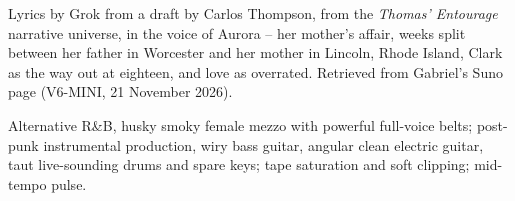 
\begin{notes}
Lyrics by Grok from a draft by Carlos Thompson, from the \emph{Thomas' Entourage} narrative universe, in the voice of Aurora -- her mother's affair, weeks split between her father in Worcester and her mother in Lincoln, Rhode Island, Clark as the way out at eighteen, and love as overrated. Retrieved from Gabriel's Suno page (V6-MINI, 21 November 2026).
\end{notes}
\begin{style}
Alternative R\&B, husky smoky female mezzo with powerful full-voice belts; post-punk instrumental production, wiry bass guitar, angular clean electric guitar, taut live-sounding drums and spare keys; tape saturation and soft clipping; mid-tempo pulse.
\end{style}

